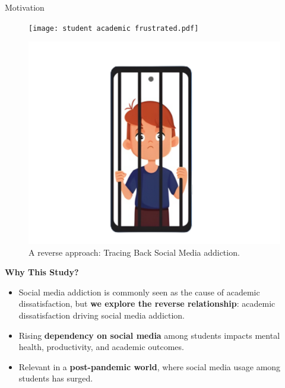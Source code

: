 \documentclass{beamer}
\begin{document}
\begin{frame}{Motivation}

\begin{figure}
    \centering
    \begin{minipage}{0.25\linewidth}
        \centering
        \texttt{[image: student academic frustrated.pdf]}
    \end{minipage}
    \hfill
    \begin{minipage}{0.25\linewidth}
        \centering
        \includegraphics[width=\linewidth]{phone addicted.pdf}
    \end{minipage}
    \caption{A reverse approach: Tracing Back Social Media addiction.}
    \label{fig:lime-comparison}
\end{figure}

        \textbf{Why This Study?}
        \begin{itemize}
            \item Social media addiction is commonly seen as the cause of academic dissatisfaction, but \textbf{we explore the reverse relationship}: academic dissatisfaction driving social media addiction.
            \item Rising \textbf{dependency on social media} among students impacts mental health, productivity, and academic outcomes.
            \item Relevant in a \textbf{post-pandemic world}, where social media usage among students has surged.
        \end{itemize}
\end{frame}
\end{document}
